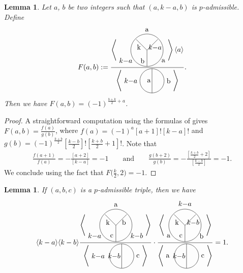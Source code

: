 \documentclass[pdftex]{sigma}
\numberwithin{equation}{section}
\newtheorem{Lemma}[Theorem]{Lemma}
\begin{document}
\begin{Lemma}\label{lemma_A}Let $a$, $b$ be two integers such that $(a,k-a,b)$ is $p$-admissible. Define
\begin{gather*} F(a,b):=\frac{\left< \Tetahedrongraph{a}{k}{$k{-}a$}{$k{-}a$}{b}{a} \right> \langle a \rangle }{\left<\thetagraph{$k{-}a$}{a}{b}\right>}.\end{gather*}
Then we have $F(a,b)=(-1)^{\frac{b+k}{2}+a}$.
\end{Lemma}

\begin{proof}A straightforward computation using the formulas of \cite{MV} gives $F(a,b)= \frac{f(a)}{g(b)}$, where $f(a)=(-1)^a [a+1]![k-a]!$ and $g(b)=(-1)^{\frac{k+b}{2}}\left[\frac{k-b}{2}\right]!\left[\frac{k+b}{2}+1\right]! $. Note that
\begin{gather*}
\frac{f(a+1)}{f(a)}=-\frac{[a+2]}{[k-a]}=-1\qquad \text{and} \qquad \frac{g(b+2)}{g(b)}=-\frac{\left[\frac{k+b}{2}+2\right]}{\left[\frac{k-b}{2}\right]}=-1.\end{gather*}
We conclude using the fact that $F\big(\frac{k}{2},2\big)=-1$.
\end{proof}

\begin{Lemma}\label{lemma_B}If $(a,b,c)$ is a $p$-admissible triple, then we have
\begin{gather*} \langle k-a\rangle \langle k-b\rangle \frac{\left< \Tetahedrongraph{a}{k}{b}{$k{-}a$}{c}{$k{-}b$}\right>}{\left< \thetagraph{$k{-}a$~~}{$k{-}b$}{c} \right>} \cdot \frac{\left< \Tetahedrongraph{$k{-}a$}{k}{$k{-}b$}{a}{c}{b}\right>}{\left< \thetagraph{a~~}{$k{-}b$}{c} \right>}=1.
\end{gather*}
\end{Lemma}
\end{document}
